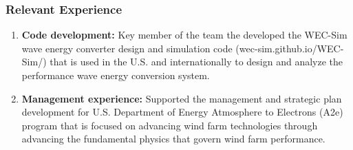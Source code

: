 \documentclass[10pt]{article}
\begin{document}
\vspace{-0.2in}
\subsubsection*{Relevant Experience}
\vspace{-0.1in}
\begin{enumerate}[leftmargin=1.5pc,itemsep=2pt,parsep=0pt,topsep=0pt,partopsep=1pt]
\item \textbf{Code development:} Key member of the team the developed the WEC-Sim wave energy converter design and simulation code (wec-sim.github.io/WEC-Sim/) that is used in the U.S. and internationally to design and analyze the performance wave energy conversion system.
\item \textbf{Management experience:} Supported the management and strategic plan development for U.S. Department of Energy Atmosphere to Electrons (A2e) program that is focused on advancing wind farm technologies through advancing the fundamental physics that govern wind farm performance.
\end{enumerate}
\end{document}
